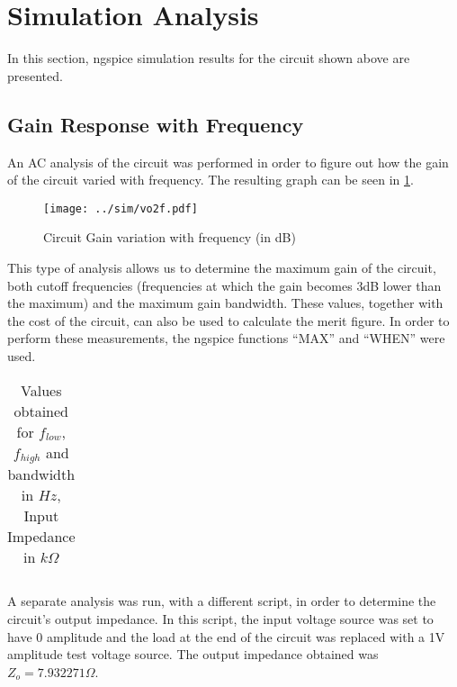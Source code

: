 \section{Simulation Analysis}
\label{sec:simulation}

In this section, ngspice simulation results for the circuit shown above are presented.


\subsection{Gain Response with Frequency}

An AC analysis of the circuit was performed in order to figure out how the gain of the circuit varied with frequency. The resulting graph can be seen in \ref{fig:gain_freq}.

\begin{figure}[H] \centering
\texttt{[image: ../sim/vo2f.pdf]}
\caption{Circuit Gain variation with frequency (in dB)}
\label{fig:gain_freq}
\end{figure}

This type of analysis allows us to determine the maximum gain of the circuit, both cutoff frequencies (frequencies at which the gain becomes 3dB lower than the maximum) and the maximum gain bandwidth. These values, together with the cost of the circuit, can also be used to calculate the merit figure. In order to perform these measurements, the ngspice functions ``MAX'' and ``WHEN'' were used.

\begin{table}[H]
  \centering
  \begin{tabular}{|c|c|}
    \hline
      
  \end{tabular}
  \caption{Values obtained for $f_{low}$, $f_{high}$ and bandwidth in $Hz$, Input Impedance in $k\Omega$}
  \label{tab:resultssim}
\end{table}

A separate analysis was run, with a different script, in order to determine the circuit's output impedance. In this script, the input voltage source was set to have 0 amplitude and the load at the end of the circuit was replaced with a 1V amplitude test voltage source. The output impedance obtained was $Z_o = 7.932271 \Omega$.





